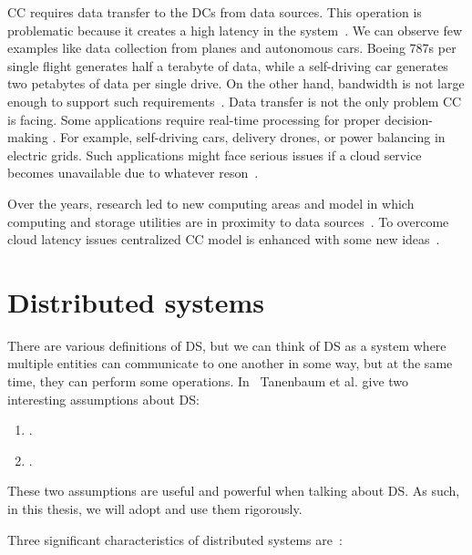 CC requires data transfer to the DCs from data sources. This operation is problematic because it creates a high latency in the system~\cite{HossainRH18}. We can observe few examples like data collection from planes and autonomous cars. Boeing 787s per single flight generates half a terabyte of data, while a self-driving car generates two petabytes of data per single drive. On the other hand, bandwidth is not large enough to support such requirements~\cite{CaoZS18}. Data transfer is not the only problem CC is facing. Some applications require real-time processing for proper decision-making \cite{CaoZS18}. For example, self-driving cars, delivery drones, or power balancing in electric grids. Such applications might face serious issues if a cloud service becomes unavailable due to whatever reson~\cite{GunawiHSLSAE16}.

Over the years, research led to new computing areas and model in which computing and storage utilities are in proximity to data sources~\cite{Satyanarayanan17}. To overcome cloud latency issues centralized CC model is enhanced with some new ideas~\cite{NingLSY20}.
%
%
%
\section{Distributed systems}\label{sec:distributed_systems}
%
There are various definitions of DS, but we can think of DS as a system where multiple entities can communicate to one another in some way, but at the same time, they can perform some operations. In~\cite{SteenT16, 0019513} Tanenbaum et al. give two interesting assumptions about DS:

\begin{enumerate}[start=1,label={(\bfseries \arabic*)}]
	\item  {}.
	\item {}.\label{ds:asumption_2}
\end{enumerate}

\noindent
These two assumptions are useful and powerful when talking about DS. As such, in this thesis, we will adopt and use them rigorously.

Three significant characteristics of distributed systems are~\cite{0019513}: 


